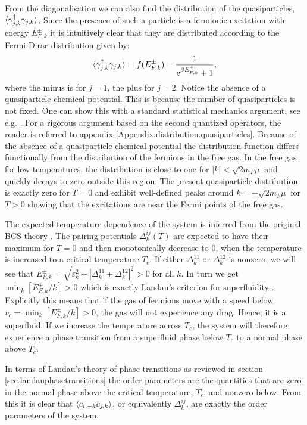 From the diagonalisation we can also find the distribution of the quasiparticles, $\braket{\gamma^\dagger_{j,k}\gamma_{j,k}}$. Since the presence of such a particle is a fermionic excitation with energy $E^{\pm}_{F,k}$ it is intuitively clear that they are distributed according to the Fermi-Dirac distribution given by:
\begin{equation}
\braket{\gamma^\dagger_{j,k} \gamma_{j,k}} = f(E^{\pm}_{F,k}) = \frac{1}{\text{e}^{\beta E^{\pm}_{F,k}} + 1}, 
\label{eq.Distribution.quasiparticles}
\end{equation}
where the minus is for $j = 1$, the plus for $j = 2$. Notice the absence of a quasiparticle chemical potential. This is because the number of quasiparticles is not fixed. One can show this with a standard statistical mechanics argument, see e.g. \cite[p. 225]{SchroederThermal}. For a rigorous argument based on the second quantized operators, the reader is referred to appendix \ref{Appendix.distribution.quasiparticles}. Because of the absence of a quasiparticle chemical potential the distribution function differs functionally from the distribution of the fermions in the free gas. In the free gas for low temperatures, the distribution is close to one for $|k|< \sqrt{2m_F\mu}$ and quickly decays to zero outside this region. The present quasiparticle distribution is exactly zero for $T = 0$ and exhibit well-defined peaks around $k = \pm \sqrt{2m_F\mu}$ for $T > 0$ showing that the excitations are near the Fermi points of the free gas. 

The expected temperature dependence of the system is inferred from the original BCS-theory \cite[chapter 3]{Tinkham}. The pairing potentials $\Delta^{ij}_k(T)$ are expected to have their maximum for $T = 0$ and then monotonically decrease to 0, when the temperature is increased to a critical temperature $T_c$. If either $\Delta^{11}_k$ or $\Delta^{12}_k$ is nonzero, we will see that $E^{\pm}_{F,k} = \sqrt{\varepsilon_k^2 + |\Delta^{11}_k \pm \Delta^{12}_k|^2} > 0$ for all $k$. In turn we get $\min_k[E^{\pm}_{F,k} / k] > 0$ which is exactly Landau's criterion for superfluidity \cite[pp. 88-90]{LandauStatPhys2}. Explicitly this means that if the gas of fermions move with a speed below $v_c = \min_k[E^{\pm}_{F,k} / k] > 0$, the gas will not experience any drag. Hence, it is a superfluid. If we increase the temperature across $T_c$, the system will therefore experience a phase transition from a superfluid phase below $T_c$ to a normal phase above $T_c$.

In terms of Landau's theory of phase transitions as reviewed in section \ref{sec.landauphasetransitions} the order parameters are the quantities that are zero in the normal phase above the critical temperature, $T_c$, and nonzero below. From this it is clear that $\braket{c_{i,-k}c_{j,k}}$, or equivalently $\Delta^{ij}_k$, are exactly the order parameters of the system.

